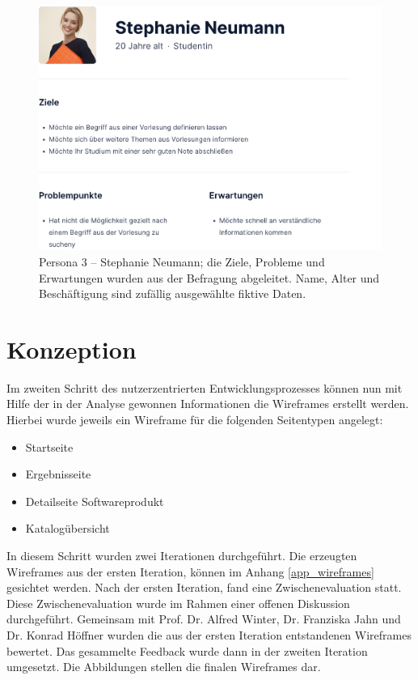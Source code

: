 \begin{figure}[H]
	\centering
    	\includegraphics[width=1.1\textwidth]{Images/Persona_3}
   	\caption[Persona 3]{Persona 3 -- Stephanie Neumann; die Ziele, Probleme und Erwartungen wurden aus der Befragung abgeleitet. Name, Alter und Beschäftigung sind zufällig ausgewählte fiktive Daten.}
   	\label{fig:persona3}
\end{figure}

\section{Konzeption}

Im zweiten Schritt des nutzerzentrierten Entwicklungsprozesses können nun mit Hilfe der in der Analyse gewonnen Informationen die Wireframes erstellt werden.
Hierbei wurde jeweils ein Wireframe für die folgenden Seitentypen angelegt:

\begin{itemize}
\item Startseite
\item Ergebnisseite
\item Detailseite Softwareprodukt
\item Katalogübersicht
\end{itemize}

In diesem Schritt wurden zwei Iterationen durchgeführt.
Die erzeugten Wireframes aus der ersten Iteration, können im Anhang \ref{app_wireframes} gesichtet werden.
Nach der ersten Iteration, fand eine Zwischenevaluation statt.
Diese Zwischenevaluation wurde im Rahmen einer offenen Diskussion durchgeführt.
Gemeinsam mit Prof. Dr. Alfred Winter, Dr. Franziska Jahn und Dr. Konrad Höffner wurden die aus der ersten Iteration entstandenen Wireframes bewertet.
Das gesammelte Feedback wurde dann in der zweiten Iteration umgesetzt.
Die Abbildungen  stellen die finalen Wireframes dar.

